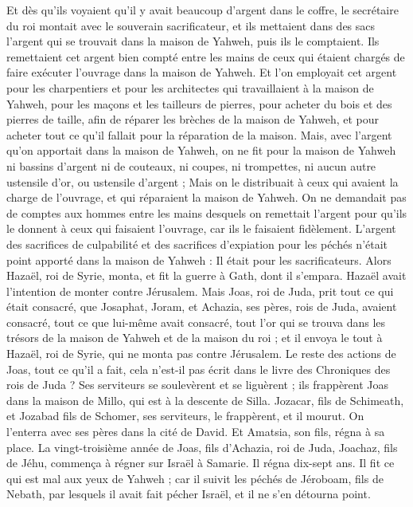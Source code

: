 \begin{multicols}{2}
Et dès qu’ils voyaient qu’il y avait beaucoup d’argent dans le coffre, le secrétaire du roi montait avec le souverain sacrificateur, et ils mettaient dans des sacs l’argent qui se trouvait dans la maison de Yahweh, puis ils le comptaient.
Ils remettaient cet argent bien compté entre les mains de ceux qui étaient chargés de faire exécuter l’ouvrage dans la maison de Yahweh. Et l’on employait cet argent pour les charpentiers et pour les architectes qui travaillaient à la maison de Yahweh,
pour les maçons et les tailleurs de pierres, pour acheter du bois et des pierres de taille, afin de réparer les brèches de la maison de Yahweh, et pour acheter tout ce qu’il fallait pour la réparation de la maison.
Mais, avec l’argent qu’on apportait dans la maison de Yahweh, on ne fit pour la maison de Yahweh ni bassins d’argent ni de couteaux, ni coupes, ni trompettes, ni aucun autre ustensile d’or, ou ustensile d’argent ;
Mais on le distribuait à ceux qui avaient la charge de l’ouvrage, et qui réparaient la maison de Yahweh.
On ne demandait pas de comptes aux hommes entre les mains desquels on remettait l’argent pour qu’ils le donnent à ceux qui faisaient l’ouvrage, car ils le faisaient fidèlement.
L’argent des sacrifices de culpabilité et des sacrifices d’expiation pour les péchés n’était point apporté dans la maison de Yahweh : Il était pour les sacrificateurs.
Alors Hazaël\FTNT{}, roi de Syrie, monta, et fit la guerre à Gath, dont il s’empara. Hazaël avait l’intention de monter contre Jérusalem.
Mais Joas, roi de Juda, prit tout ce qui était consacré, que Josaphat, Joram, et Achazia, ses pères, rois de Juda, avaient consacré, tout ce que lui-même avait consacré, tout l’or qui se trouva dans les trésors de la maison de Yahweh et de la maison du roi ; et il envoya le tout à Hazaël, roi de Syrie, qui ne monta pas contre Jérusalem.
Le reste des actions de Joas, tout ce qu’il a fait, cela n’est-il pas écrit dans le livre des Chroniques des rois de Juda ?
Ses serviteurs se soulevèrent et se liguèrent ; ils frappèrent Joas dans la maison de Millo, qui est à la descente de Silla.
Jozacar, fils de Schimeath, et Jozabad fils de Schomer, ses serviteurs, le frappèrent, et il mourut. On l’enterra avec ses pères dans la cité de David. Et Amatsia, son fils, régna à sa place.
\VerseOne{}La vingt-troisième année de Joas, fils d’Achazia, roi de Juda, Joachaz, fils de Jéhu, commença à régner sur Israël à Samarie. Il régna dix-sept ans.
Il fit ce qui est mal aux yeux de Yahweh ; car il suivit les péchés de Jéroboam, fils de Nebath, par lesquels il avait fait pécher Israël, et il ne s’en détourna point.

\end{multicols}
